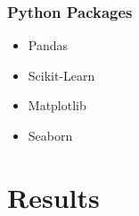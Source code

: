 \documentclass{beamer}
\begin{document}
    \begin{frame}
        \frametitle{Python Packages}

        \begin{itemize}
            \item Pandas \cite{pandas1}
            \item Scikit-Learn \cite{sklearn1}
            \item Matplotlib \cite{matplotlib1}
            \item Seaborn \cite{seaborn1}
        \end{itemize}
    \end{frame}

    \section{Results}
\end{document}
